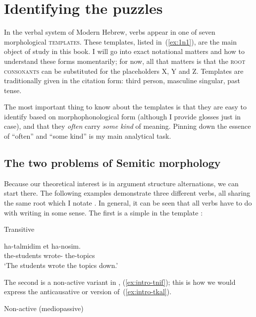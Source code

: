 \section{Identifying the puzzles} \label{intro:puzzles}
In the verbal system of Modern Hebrew, verbs appear in one of seven morphological \textsc{templates}. These templates, listed in~(\ref{ex:1n1}), are the main object of study in this book. I will go into exact notational matters and how to understand these forms momentarily; for now, all that matters is that the \textsc{root consonants} can be substituted for the placeholders X, Y and Z. Templates are traditionally given in the citation form: third person, masculine singular, past tense.
 \begin{exe}
 \ex  \label{ex:1n1}
 \begin{xlist} 
 	\ex  {\tkal} 
 	\ex  {\tnif} 
 	\ex  {\tpie} 
 	\ex  {\thit} 
 	\ex  {\thif} 
 	\ex  {\tpua} 
 	\ex  {\thuf} 
 \z
\z 

The most important thing to know about the templates is that they are easy to identify based on morphophonological form (although I provide glosses just in case), and that they \emph{often} carry \emph{some kind} of meaning. Pinning down the essence of ``often'' and ``some kind'' is my main analytical task.

	\subsection{The two problems of Semitic morphology}
Because our theoretical interest is in argument structure alternations, we can start there. The following examples demonstrate three different verbs, all sharing the same root which I notate . In general, it can be seen that all verbs have to do with writing in some sense. The first is a simple  in the template {\tkal}:
 \begin{exe}
\ex 	\label{ex:intro-tkal}Transitive {\tkal} 
		
 		\gll  ha-talmidim  et ha-nosim.\\
 		  the-students wrote-  the-topics\\
 		\glt `The students wrote the topics down.' 
	
 \z 

The second is a non-active variant in {\tnif}, (\ref{ex:intro-tnif}); this is how we would express the anticausative or  version of~(\ref{ex:intro-tkal}).
 \begin{exe}
\ex  \label{ex:intro-tnif}Non-active (mediopassive) {\tnif} 
		

\end{exe}
\end{exe}
\end{xlist}
\end{exe}
